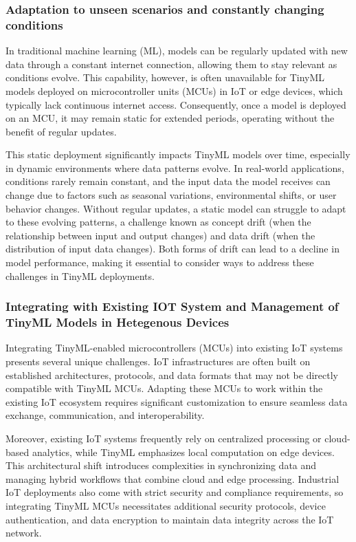 \documentclass[twocolumn]{article}
\begin{document}
\subsubsection{Adaptation to unseen scenarios and constantly changing conditions}
In traditional machine learning (ML), models can be regularly updated with new data through a constant internet connection, allowing them to stay relevant as conditions evolve. This capability, however, is often unavailable for TinyML models deployed on microcontroller units (MCUs) in IoT or edge devices, which typically lack continuous internet access. Consequently, once a model is deployed on an MCU, it may remain static for extended periods, operating without the benefit of regular updates.

This static deployment significantly impacts TinyML models over time, especially in dynamic environments where data patterns evolve. In real-world applications, conditions rarely remain constant, and the input data the model receives can change due to factors such as seasonal variations, environmental shifts, or user behavior changes. Without regular updates, a static model can struggle to adapt to these evolving patterns, a challenge known as concept drift (when the relationship between input and output changes) and data drift (when the distribution of input data changes). Both forms of drift can lead to a decline in model performance, making it essential to consider ways to address these challenges in TinyML deployments.


\subsubsection{Integrating with Existing IOT System and Management of TinyML Models in Hetegenous Devices}
Integrating TinyML-enabled microcontrollers (MCUs) into existing IoT systems presents several unique challenges. IoT infrastructures are often built on established architectures, protocols, and data formats that may not be directly compatible with TinyML MCUs. Adapting these MCUs to work within the existing IoT ecosystem requires significant customization to ensure seamless data exchange, communication, and interoperability.

Moreover, existing IoT systems frequently rely on centralized processing or cloud-based analytics, while TinyML emphasizes local computation on edge devices. This architectural shift introduces complexities in synchronizing data and managing hybrid workflows that combine cloud and edge processing. Industrial IoT deployments also come with strict security and compliance requirements, so integrating TinyML MCUs necessitates additional security protocols, device authentication, and data encryption to maintain data integrity across the IoT network.
\end{document}
